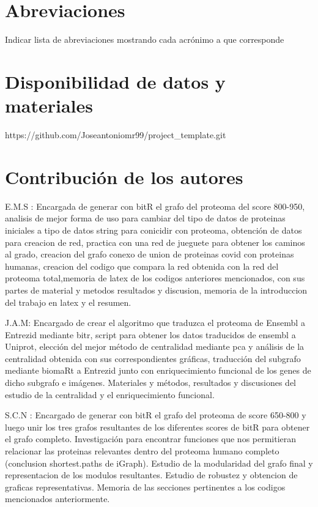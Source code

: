 \documentclass{bmcart}
\begin{document}
	\begin{backmatter}
	
		\section*{Abreviaciones}%
			Indicar lista de abreviaciones mostrando cada acrónimo a que corresponde
		
		\section*{Disponibilidad de datos y materiales}%
			https://github.com/Joseantoniomr99/project_template.git
		
		\section*{Contribución de los autores}
			E.M.S : Encargada de generar con bitR el grafo del proteoma del score 800-950, analisis de mejor forma de uso para cambiar del tipo de 
			datos de proteinas iniciales a tipo de datos string para conicidir con proteoma, obtención de datos para creacion de red, 
			practica con una red de jueguete para obtener los caminos al grado, creacion del grafo conexo de union de proteinas covid con proteinas 
			humanas, creacion del codigo que compara la red obtenida con la red del proteoma total,memoria de latex de los codigos
			anteriores mencionados, con sus partes de material y metodos resultados y discusion, memoria de la introduccion del trabajo en latex 
			y el resumen.
			
			J.A.M: Encargado de crear el algoritmo que traduzca el proteoma de Ensembl a Entrezid mediante bitr, script para obtener los datos traducidos de ensembl 			 a Uniprot, elecci\'on del mejor m\'etodo de centralidad mediante pca y an\'alisis de la centralidad obtenida con sus correspondientes gr\'aficas, 				traducci\'on del subgrafo mediante biomaRt a Entrezid junto con enriquecimiento funcional de los genes de dicho subgrafo e im\'agenes. Materiales y 				m\'etodos, resultados y discusiones del estudio de la centralidad y el enriquecimiento funcional.
			
			S.C.N : Encargado de generar con bitR el grafo del proteoma de score 650-800 y luego unir los tres grafos resultantes de los diferentes 
			scores de bitR para obtener el grafo completo. Investigación para encontrar funciones que nos permitieran relacionar las proteinas 
			relevantes dentro del proteoma humano completo (conclusion shortest.paths de iGraph). 
			Estudio de la modularidad del grafo final y representacion de los modulos resultantes. Estudio de robustez y obtencion de graficas representativas.
			Memoria de las secciones pertinentes a los codigos mencionados anteriormente.
		

\end{backmatter}
\end{document}
